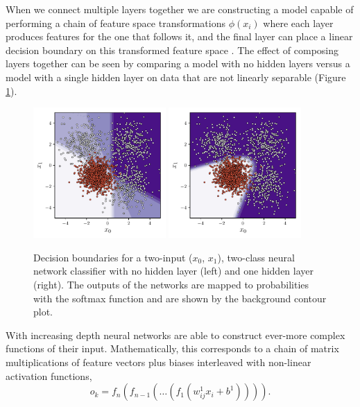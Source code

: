When we connect multiple layers together we are constructing a model capable of performing a chain of feature space transformations $\phi(x_{i})$ where each layer produces features for the one that follows it, and the final layer can place a linear decision boundary on this transformed feature space \cite{DeepLearningBook}. 
The effect of composing layers together can be seen by comparing a model with no hidden layers versus a model with a single hidden layer on data that are not linearly separable (Figure \ref{fig:machine_learning:mlp_example}).

\begin{figure}[h!]
    \begin{center}
        \includegraphics[width=0.45\textwidth]{figures/machine_learning/decision_bound_tanh_depth_1.pdf}
        \includegraphics[width=0.45\textwidth]{figures/machine_learning/decision_bound_tanh_depth_2.pdf}
    \end{center}
    \caption{Decision boundaries for a two-input ($x_{0}$, $x_{1}$), two-class neural network classifier with no hidden layer (left) and one hidden layer (right). The outputs of the networks are mapped to probabilities with the softmax function and are shown by the background contour plot. }
        \label{fig:machine_learning:mlp_example}
\end{figure}
With increasing depth neural networks are able to construct ever-more complex functions of their input. 
Mathematically, this corresponds to a chain of matrix multiplications of feature vectors plus biases interleaved with non-linear activation functions,
\begin{equation}
    o_{k} = f_{n}(f_{n-1}(\dots{}(f_{1}(w^{1}_{ij}x_{i} + b^{1})))).
\end{equation}



